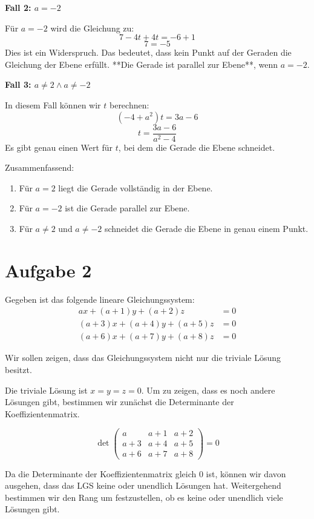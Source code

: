 \documentclass[11pt]{article}
\begin{document}
\textbf{Fall 2: \( a = -2 \)}

Für \( a = -2 \) wird die Gleichung zu:
\[
7 - 4t + 4t = -6 + 1
\]
\[
7 = -5
\]
Dies ist ein Widerspruch. Das bedeutet, dass kein Punkt auf der Geraden die Gleichung der Ebene erfüllt. **Die Gerade ist parallel zur Ebene**, wenn \( a = -2 \).

\textbf{Fall 3: \( a \neq 2 \land a \neq -2 \)}

In diesem Fall können wir \( t \) berechnen:
\[
( -4 + a^2 )t = 3a - 6
\]
\[
t = \frac{3a - 6}{a^2 - 4}
\]
Es gibt genau einen Wert für \( t \), bei dem die Gerade die Ebene schneidet.

Zusammenfassend:
\begin{enumerate}
  \item Für \( a = 2 \) liegt die Gerade vollständig in der Ebene.
  \item Für \( a = -2 \) ist die Gerade parallel zur Ebene.
  \item Für \( a \neq 2 \) und \( a \neq -2 \) schneidet die Gerade die Ebene in genau einem Punkt.
\end{enumerate}
\section*{Aufgabe 2}


Gegeben ist das folgende lineare Gleichungssystem:
\[
\begin{aligned}
a x + (a+1) y + (a+2) z &= 0 \\
(a+3) x + (a+4) y + (a+5) z &= 0 \\
(a+6) x + (a+7) y + (a+8) z &= 0
\end{aligned}
\]

Wir sollen zeigen, dass das Gleichungssystem nicht nur die triviale Lösung besitzt.


Die triviale Lösung ist \( x = y = z = 0 \). Um zu zeigen, dass es noch andere Lösungen gibt, bestimmen wir zunächst die Determinante der Koeffizientenmatrix.

\[
\det\begin{pmatrix}
    a & a+1 & a+2 \\
    a +3 & a+4 & a+5 \\
    a+6 & a+7 & a+8
\end{pmatrix} = 0
\]

Da die Determinante der Koeffizientenmatrix gleich 0 ist, können wir davon ausgehen, dass das LGS keine oder unendlich Lösungen hat.
Weitergehend bestimmen wir den Rang um festzustellen, ob es keine oder unendlich viele Lösungen gibt.
\end{document}

